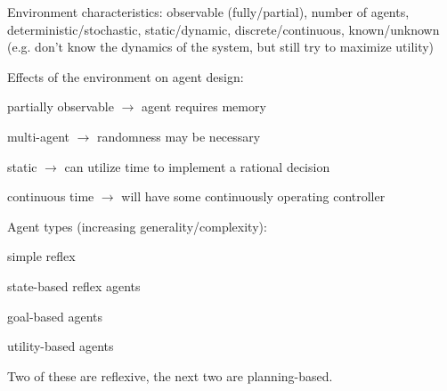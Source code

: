 \documentclass[12pt]{article}
\begin{document}
Environment characteristics: observable (fully/partial), number of agents, deterministic/stochastic, static/dynamic, discrete/continuous, known/unknown (e.g. don't know the dynamics of the system, but still try to maximize utility)

\noindent
Effects of the environment on agent design:

partially observable $\to$ agent requires memory

multi-agent $\to$ randomness may be necessary

static $\to$ can utilize time to implement a rational decision

continuous time $\to$ will have some continuously operating controller

\noindent
Agent types (increasing generality/complexity):

simple reflex

state-based reflex agents

goal-based agents

utility-based agents

\noindent
Two of these are reflexive, the next two are planning-based.
\end{document}
